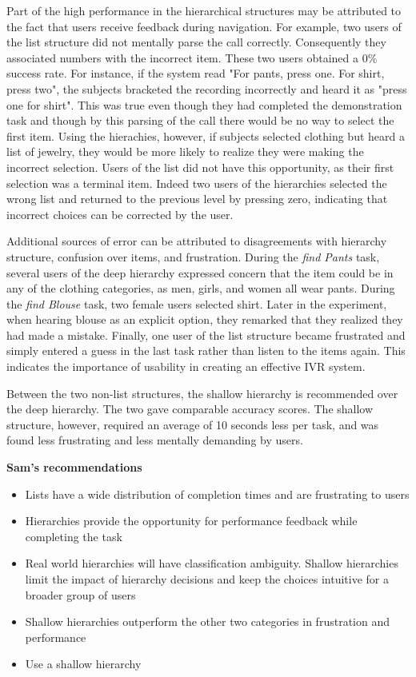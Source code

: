 \documentclass{sigchi}
\begin{document}
Part of the high performance in the hierarchical structures may be attributed to the fact that users receive feedback during navigation. For example, two users of the list structure did not mentally parse the call correctly. Consequently they associated numbers with the incorrect item. These two users obtained a 0\% success rate. For instance, if the system read "For pants, press one. For shirt, press two", the subjects bracketed the recording incorrectly and heard it as "press one for shirt". This was true even though they had completed the demonstration task and though by this parsing of the call there would be no way to select the first item. Using the hierachies, however, if subjects selected clothing but heard a list of jewelry, they would be more likely to realize they were making the incorrect selection. Users of the list did not have this opportunity, as their first selection was a terminal item. Indeed two users of the hierarchies selected the wrong list and returned to the previous level by pressing zero, indicating that incorrect choices can be corrected by the user.

Additional sources of error can be attributed to disagreements with hierarchy structure, confusion over items, and frustration. During the \textit{find Pants} task, several users of the deep hierarchy expressed concern that the item could be in any of the clothing categories, as men, girls, and women all wear pants. During the \textit{find Blouse} task, two female users selected shirt. Later in the experiment, when hearing blouse as an explicit option, they remarked that they realized they had made a mistake. Finally, one user of the list structure became frustrated and simply entered a guess in the last task rather than listen to the items again. This indicates the importance of usability in creating an effective IVR system.

Between the two non-list structures, the shallow hierarchy is recommended over the deep hierarchy. The two gave comparable accuracy scores. The shallow structure, however, required an average of 10 seconds less per task, and was found less frustrating and less mentally demanding by users.

\textbf{Sam's recommendations}

\begin{itemize}
\item  Lists have a wide distribution of completion times and are frustrating to users
\item Hierarchies provide the opportunity for performance feedback while completing the task
\item Real world hierarchies will have classification ambiguity. Shallow hierarchies limit the impact of hierarchy decisions and keep the choices intuitive for a broader group of users
\item Shallow hierarchies outperform the other two categories in frustration and performance
\item Use a shallow hierarchy
\end{itemize}
\end{document}
